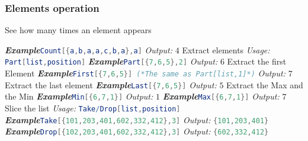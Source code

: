 \documentclass[10pt]{book}
\begin{document}
\subsubsection{Elements operation}
\noindent See how many times an element appears

\noindent\emph{\textbf{Example}}\quad \lstinline[language=Mathematica]|Count[{a,b,a,a,c,b,a},a]| \hspace{\fill}\emph{Output:} $4$
\newline
\newline
\noindent Extract elements
\newline
\noindent \emph{Usage:} \lstinline[language=Mathematica]|Part[list,position]| 
\newline
\noindent\emph{\textbf{Example}}\quad \lstinline[language=Mathematica]|Part[{7,6,5},2]| \hspace{\fill}\emph{Output:} $6$
\newline
\newline
\noindent Extract the first Element
\newline
\noindent\emph{\textbf{Example}}\quad \lstinline[language=Mathematica]|First[{7,6,5}] (*The same as Part[list,1]*)| \hspace{\fill}\emph{Output:} $7$
\newline
\newline
\noindent Extract the last element
\newline
\noindent\emph{\textbf{Example}}\quad \lstinline[language=Mathematica]|Last[{7,6,5}]| \hspace{\fill}\emph{Output:} $5$
\newline
\newline
\noindent Extract the Max and the Min
\newline
\noindent\emph{\textbf{Example}}\quad \lstinline[language=Mathematica]|Min[{6,7,1}]| \hspace{\fill}\emph{Output:} $1$
\newline
\noindent\emph{\textbf{Example}}\quad \lstinline[language=Mathematica]|Max[{6,7,1}]| \hspace{\fill}\emph{Output:} $7$
\newline
\newline
\noindent Slice the list
\newline
\noindent \emph{Usage:} \lstinline[language=Mathematica]|Take/Drop[list,position]| 
\newline
\noindent\emph{\textbf{Example}}\quad \lstinline[language=Mathematica]|Take[{101,203,401,602,332,412},3]| \hspace{\fill}\emph{Output:} \lstinline[language=Mathematica]|{101,203,401}|
\newline
\noindent\emph{\textbf{Example}}\quad \lstinline[language=Mathematica]|Drop[{102,203,401,602,332,412},3]| \hspace{\fill}\emph{Output:} \lstinline[language=Mathematica]|{602,332,412}| 
\end{document}
